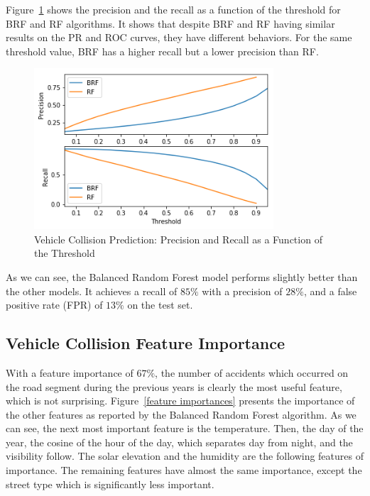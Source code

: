\documentclass[conference]{IEEEtran}
\begin{document}
Figure~\ref{fig:pr-threshold} shows the precision and the recall as a function of the threshold for BRF and RF algorithms.
It shows that despite BRF and RF having similar results on the PR and ROC curves, they have different behaviors. For the same threshold value, BRF has a higher recall but a lower precision than RF.

\begin{figure}[htbp]
\centerline{\includegraphics[height=6cm, keepaspectratio]{Figures/pr_threshold.png}}
\caption{Vehicle Collision Prediction: Precision and Recall as a Function of the Threshold}
\label{fig:pr-threshold}
\end{figure}

As we can see, the Balanced Random Forest model performs slightly better than the other models.
It achieves a recall of $85\%$ with a precision of $28\%$, and a false positive rate (FPR) of $13\%$ on the test set.


\subsection{Vehicle Collision Feature Importance}

With a
feature importance of $67\%$, the number of accidents which occurred on the
road segment during the previous years is clearly the most useful feature, which
is not surprising. Figure~\ref{feature importances} presents the
importance of the other features as reported by the Balanced Random Forest
algorithm. As we can see, the next most important feature is the temperature. 
Then, the day of the year, the cosine of the hour of the day, which separates day from night,
and the visibility follow. The solar elevation and the humidity are 
the following features of importance. The remaining features have almost
the same importance, except the street type which
is significantly less important.
\end{document}
